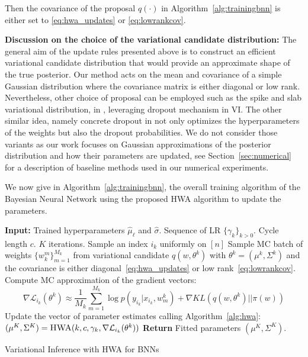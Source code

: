 \documentclass[tablecaption=bottom,wcp]{jmlr} %
\begin{document}
Then the covariance of the proposal $q(\cdot)$ in Algorithm~\ref{alg:trainingbnn} is either set to \eqref{eq:hwa_updates} or \eqref{eq:lowrankcov}.

\textbf{Discussion on the choice of the variational candidate distribution:} 
The general aim of the update rules presented above is to construct an efficient variational candidate distribution that would provide an approximate shape of the true posterior. Our method acts on the mean and covariance of a simple Gaussian distribution where the covariance matrix is either diagonal or low rank.
Nevertheless, other choice of proposal can be employed such as the spike and slab variational distribution, in \citep{gal2016dropout}, leveraging dropout mechanism in VI. 
The other similar idea, namely concrete dropout in \citep{gal2017concrete} not only optimizes the hyperparameters of the weights but also the dropout probabilities.
We do not consider those variants as our work focuses on Gaussian approximations of the posterior distribution and how their parameters are updated, see Section~\ref{sec:numerical} for a description of baseline methods used in our numerical experiments.


We now give in Algorithm~\ref{alg:trainingbnn}, the overall training algorithm of the Bayesian Neural Network using the proposed HWA algorithm to update the parameters.
\begin{algorithm}[H]
\begin{algorithmic}[1]
\STATE \textbf{Input:} Trained hyperparameters $\hat{\mu}_{\ell}$ and $\hat{\sigma}$. Sequence of LR $\{\gamma_k\}_{k > 0}$. Cycle length $c$. $K$ iterations.
\STATE Sample an index $i_k$ uniformly on $[n]$
\STATE Sample MC batch of weights $\{w^m_k\}_{m=1}^{M_k}$  from variational candidate $q(w, \theta^k)$ with $\theta^k = (\mu^k, \Sigma^k)$ and the covariance is either diagonal~\eqref{eq:hwa_updates} or low rank~\eqref{eq:lowrankcov}.
\STATE Compute MC approximation of the gradient vectors:
$$ \nabla \mathcal{L}_{i_{k}}(\theta^{k}) \approx \frac{1}{M_k} \sum_{m=1}^{M_k} \log p(y_{i_k} | x_{i_k}, w^k_m)  + \nabla KL(q(w, \theta^k)||\pi(w)) $$
\STATE Update the vector of parameter estimates calling Algorithm~\ref{alg:hwa}: $(\mu^K, \Sigma^K) =  \textsc{HWA}(k, c, \gamma_k, \nabla \mathcal{L}_{i_{k}}(\theta^{k}) )$
\ENDFOR
\STATE \textbf{Return} Fitted parameters $(\mu^K, \Sigma^K)$.
\end{algorithmic}
\caption{Variational Inference with HWA for BNNs}
\label{alg:trainingbnn}
\end{algorithm}
\end{document}
